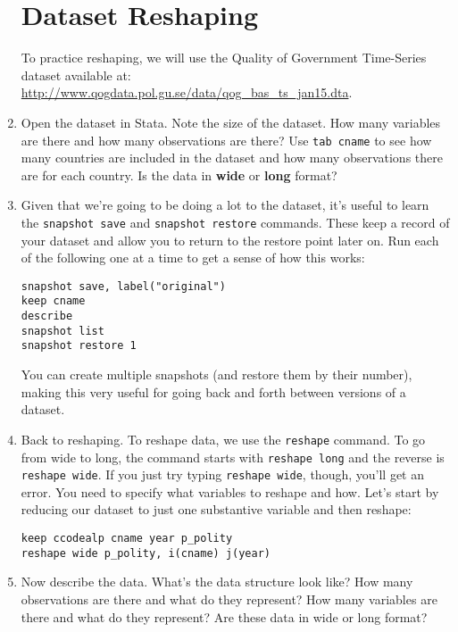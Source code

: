 \documentclass[a4paper,12pt]{article}
\begin{document}
\begin{enumerate}
\section*{Dataset Reshaping}

To practice reshaping, we will use the Quality of Government Time-Series dataset available at: \url{http://www.qogdata.pol.gu.se/data/qog_bas_ts_jan15.dta}.

\item Open the dataset in Stata. Note the size of the dataset. How many variables are there and how many observations are there? Use \texttt{tab cname} to see how many countries are included in the dataset and how many observations there are for each country. Is the data in \textbf{wide} or \textbf{long} format?

\item Given that we're going to be doing a lot to the dataset, it's useful to learn the \texttt{snapshot save} and \texttt{snapshot restore} commands. These keep a record of your dataset and allow you to return to the restore point later on. Run each of the following one at a time to get a sense of how this works:

\begin{verbatim}
snapshot save, label("original")
keep cname
describe
snapshot list
snapshot restore 1
\end{verbatim}

\noindent You can create multiple snapshots (and restore them by their number), making this very useful for going back and forth between versions of a dataset.

\item Back to reshaping. To reshape data, we use the \texttt{reshape} command. To go from wide to long, the command starts with \texttt{reshape long} and the reverse is \texttt{reshape wide}. If you just try typing \texttt{reshape wide}, though, you'll get an error. You need to specify what variables to reshape and how. Let's start by reducing our dataset to just one substantive variable and then reshape:

\begin{verbatim}
keep ccodealp cname year p_polity
reshape wide p_polity, i(cname) j(year)
\end{verbatim}

\item Now describe the data. What's the data structure look like? How many observations are there and what do they represent? How many variables are there and what do they represent? Are these data in wide or long format?


\end{enumerate}
\end{document}
